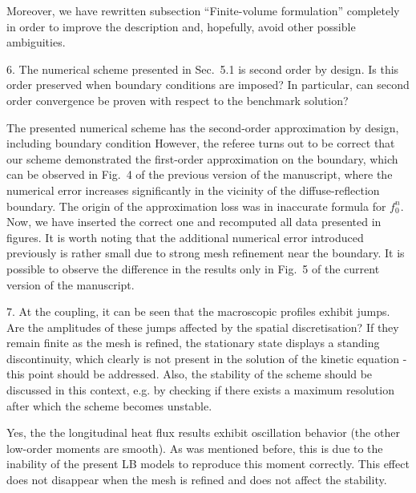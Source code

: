 \documentclass{article}
\begin{document}
Moreover, we have rewritten subsection ``Finite-volume formulation'' completely
in order to improve the description and, hopefully, avoid other possible ambiguities.

\begin{leftbar}
\end{leftbar}

\begin{quoting}
    6. The numerical scheme presented in Sec.~5.1 is
    second order by design. Is this order preserved
    when boundary conditions are imposed? In particular,
    can second order convergence be proven with respect
    to the benchmark solution?
\end{quoting}

The presented numerical scheme has the second-order approximation by design,
including boundary condition
However, the referee turns out to be correct that our scheme demonstrated the first-order approximation
on the boundary, which can be observed in Fig.~4 of the previous version of the manuscript,
where the numerical error increases significantly in the vicinity of the diffuse-reflection boundary.
The origin of the approximation loss was in inaccurate formula for \(f^n_0\).
Now, we have inserted the correct one and recomputed all data presented in figures.
It is worth noting that the additional numerical error introduced previously is rather small
due to strong mesh refinement near the boundary. It is possible to observe the difference
in the results only in Fig.~5 of the current version of the manuscript.

\begin{leftbar}
\end{leftbar}

\begin{quoting}
    7. At the coupling, it can be seen that the
    macroscopic profiles exhibit jumps. Are the
    amplitudes of these jumps affected by the spatial
    discretisation? If they remain finite as the
    mesh is refined, the stationary state displays
    a standing discontinuity, which clearly is not
    present in the solution of the kinetic equation -
    this point should be addressed. Also, the stability
    of the scheme should be discussed in this context,
    e.g. by checking if there exists a maximum
    resolution after which the scheme becomes unstable.
\end{quoting}

Yes, the the longitudinal heat flux results exhibit oscillation behavior
(the other low-order moments are smooth). As was mentioned before,
this is due to the inability of the present LB models to reproduce this moment correctly.
This effect does not disappear when the mesh is refined and does not affect the stability.
\end{document}
